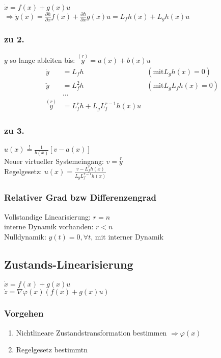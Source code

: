 \documentclass[6pt,a4paper,fleqn]{scrartcl}
\begin{document}
\begin{multicols*}{4}
$\dot{x} = f(x) + g(x)u$ \\
$\Rightarrow \dot{y}(x) = \frac{\partial h}{\partial x}f(x) + \frac{\partial h}{\partial x}g(x)u = L_f h(x) + L_g h(x) u$ \\

\subsubsection*{zu 2.}
$y$ so lange ableiten bis: $\overset{(r)}{y} = a(x) + b(x) u$ \\
\begin{align*}
  \dot{y}           &= L_f h                            &(\text{mit} L_g h(x) = 0) \\
  \ddot{y}          &= L_f^2 h                          &(\text{mit} L_g L_f h(x) = 0) \\
                    &\dots                              & \\
  \overset{(r)}{y}  &= L_f^r h + L_g L_f^{r-1} h(x) u   &
\end{align*}

\subsubsection*{zu 3.}
$u(x) \overset{!}{=} \frac{1}{b(x)} [v - a(x)]$ \\
Neuer virtueller Systemeingang: $v = \overset{r}{y}$ \\
Regelgesetz: $u(x) = \frac{v - L_f^r h(x)}{L_g L_f^{r-1} h(x)}$

\subsubsection*{Relativer Grad bzw Differenzengrad}
Vollstandige Linearisierung: $r = n$ \\
interne Dynamik vorhanden: $r < n$ \\
Nulldynamik: $y(t) = 0, \forall t$, mit interner Dynamik


\subsection{Zustands-Linearisierung}
$\dot{x} = f(x) + g(x)u$ \\
$\dot{z} = \nabla \varphi(x) \left( f(x) + g(x)u \right)$

\subsubsection*{Vorgehen}
\begin{enumerate}
  \item Nichtlineare Zustandstransformation bestimmen $\Rightarrow \varphi(x)$
  \item Regelgesetz bestimmtn
\end{enumerate}


\end{multicols*}
\end{document}
